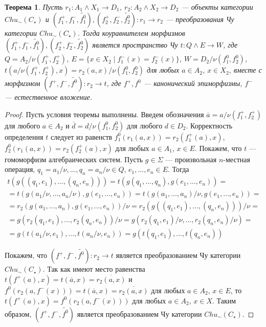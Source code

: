 \documentclass[a4paper,12pt]{article}
\newtheorem{theorem}{Теорема}
\begin{document}
\begin{theorem}
    Пусть $r_1: A_1 \wedge X_1 \to D_1$, $r_2: A_2 \wedge X_2 \to D_2$ --- объекты категории $Chu_\sim(C_\star)$ и $(f_1^+,f_1^-,\widetilde{f_1^0}), (f_2^+,f_2^-,\widetilde{f_2^0}): r_1 \to r_2$ --- преобразования Чу категории $Chu_\sim(C_\star)$. Тогда коуравнителем морфизмов $(f_1^+,f_1^-,\widetilde{f_1^0}), (f_2^+,f_2^-,\widetilde{f_2^0})$ является пространство Чу $t: Q \wedge E \to W$, где $Q = A_2/\nu(f_1^+,f_2^+)$, $E = \{x \in X_2 \mid f_1^-(x) = f_2^-(x)\}$, $W = D_2/\nu(f_1^0,f_2^0)$, $t(a/\nu(f_1^+,f_2^+),x) = r_2(a,x)/\nu(f_1^0,f_2^0)$ для любых $a \in A_2$, $x \in X_2$, вместе с морфизмом $(f^+,f^-,\widetilde{f^0}): r_2 \to t$, где $f^+,f^0$ --- канонический эпиморфизмы, $f^-$ --- естественное вложение. 
\end{theorem}
\begin{proof}
    Пусть условия теоремы выполнены. Введем обозначения $\overline{a} = a/\nu(f_1^+,f_2^+)$ для любого $a \in A_2$ и $\overline{d} = d/\nu(f_1^0,f_2^0)$ для любого $d \in D_2$. Корректность определения $t$ следует из равенств $f_1^0(r_1(a,x)) = r_2(f_1^+(a),x)$, $f_2^0(r_1(a,x)) = r_2(f_2^+(a),x)$ для любых $a \in A_1$, $x \in E$. Покажем, что $t$ --- гомоморфизм алгебраических систем. Пусть $g \in \Sigma$ --- произвольная $n$-местная операция, $q_1 = a_1/\nu,\ldots,q_n = a_n/\nu \in Q$, $e_1,\ldots,e_n \in E$. Тогда
    \begin{multline*}
        t(g((q_1,e_1),\ldots,(q_n,e_n))) = t(g(q_1,\ldots,q_n),g(e_1,\ldots,e_n)) =\\=
        t(g(a_1/\nu,\ldots,a_n/\nu),g(e_1,\ldots,e_n)) = t(g(a_1,\ldots,a_n)/\nu,g(e_1,\ldots,e_n)) =\\=
        r_2(g(a_1,\ldots,a_n),g(e_1,\ldots,e_n))/\nu = r_2(g((q_1,e_1),\ldots,(q_n,e_n)))/\nu =\\=
        g(r_2(q_1,e_1),\ldots,r_2(q_n,e_n))/\nu = g(r_2(q_1,e_1)/\nu,\ldots,r_2(q_n,e_n)/\nu) =\\=
        g(t(a_1/\nu,e_1),\ldots,t(a_n/\nu,e_n)) = g(t(q_1,e_1),\ldots,t(q_n,e_n))
    \end{multline*}

    Покажем, что $(f^+,f^-,\widetilde{f^0}): r_2 \to t$ является преобразованием Чу категории $Chu_\sim(C_\star)$. Так как имеют место равенства $t(f^+(a),x) = t(\overline{a},x) = \overline{r_2(a,x)}$ и $f^0(r_2(a,f^-(x))) = t(\overline{a},x) = \overline{r_2(a,x)}$ для любых $a \in A_2$, $x \in E$, то $t(f^+(a),x) = f^0(r_2(a,f^-(x)))$ для любых $a \in A_2$, $x \in X$. Таким образом, $(f^+,f^-,\widetilde{f^0})$ является преобразованием Чу категории $Chu_\sim(C_\star)$.


\end{proof}
\end{document}
